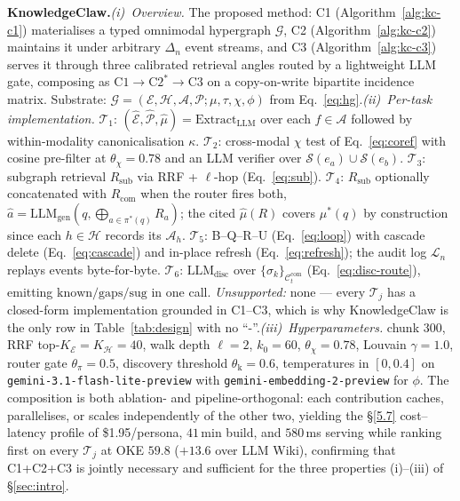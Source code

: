 \documentclass{article}
\begin{document}
\noindent\textbf{KnowledgeClaw.}\quad\emph{(i)~Overview.} The proposed method: C1 (Algorithm~\ref{alg:kc-c1}) materialises a typed omnimodal hypergraph $\mathcal{G}$, C2 (Algorithm~\ref{alg:kc-c2}) maintains it under arbitrary $\Delta_n$ event streams, and C3 (Algorithm~\ref{alg:kc-c3}) serves it through three calibrated retrieval angles routed by a lightweight LLM gate, composing as $\mathrm{C1}\!\to\!\mathrm{C2}^{*}\!\to\!\mathrm{C3}$ on a copy-on-write bipartite incidence matrix. Substrate: $\mathcal{G}\!=\!(\mathcal{E},\mathcal{H},\mathcal{A},\mathcal{P};\mu,\tau,\chi,\phi)$ from Eq.~\eqref{eq:hg}.\quad\emph{(ii)~Per-task implementation.} $\mathcal{T}_1$: $(\hat{\mathcal{E}},\hat{\mathcal{P}},\hat{\mu})\!=\!\mathrm{Extract}_{\mathrm{LLM}}$ over each $f\!\in\!\mathcal{A}$ followed by within-modality canonicalisation $\kappa$. $\mathcal{T}_2$: cross-modal $\chi$ test of Eq.~\eqref{eq:coref} with cosine pre-filter at $\theta_{\chi}\!=\!0.78$ and an LLM verifier over $\mathcal{S}(e_a)\!\cup\!\mathcal{S}(e_b)$. $\mathcal{T}_3$: subgraph retrieval $R_{\mathrm{sub}}$ via RRF + $\ell$-hop (Eq.~\eqref{eq:sub}). $\mathcal{T}_4$: $R_{\mathrm{sub}}$ optionally concatenated with $R_{\mathrm{com}}$ when the router fires both, $\hat{a}\!=\!\mathrm{LLM}_{\mathrm{gen}}(q,\bigoplus_{a\in\pi^{*}(q)}R_a)$; the cited $\hat{\mu}(R)$ covers $\mu^{*}(q)$ by construction since each $h\!\in\!\mathcal{H}$ records its $\mathcal{A}_h$. $\mathcal{T}_5$: B--Q--R--U (Eq.~\eqref{eq:loop}) with cascade delete (Eq.~\eqref{eq:cascade}) and in-place refresh (Eq.~\eqref{eq:refresh}); the audit log $\mathcal{L}_n$ replays events byte-for-byte. $\mathcal{T}_6$: $\mathrm{LLM}_{\mathrm{disc}}$ over $\{\sigma_k\}_{\mathcal{C}_t^{\mathrm{com}}}$ (Eq.~\eqref{eq:disc-route}), emitting $\mathrm{known}/\mathrm{gaps}/\mathrm{sug}$ in one call. \emph{Unsupported:} none --- every $\mathcal{T}_j$ has a closed-form implementation grounded in C1--C3, which is why KnowledgeClaw is the only row in Table~\ref{tab:design} with no ``-''.\quad\emph{(iii)~Hyperparameters.} chunk $300$, RRF top-$K_{\mathcal{E}}\!=\!K_{\mathcal{H}}\!=\!40$, walk depth $\ell\!=\!2$, $k_0\!=\!60$, $\theta_{\chi}\!=\!0.78$, Louvain $\gamma\!=\!1.0$, router gate $\theta_{\pi}\!=\!0.5$, discovery threshold $\theta_{\mathrm{k}}\!=\!0.6$, temperatures in $[0,0.4]$ on \texttt{gemini-3.1-flash-lite-preview} with \texttt{gemini-embedding-2-preview} for $\phi$. The composition is both ablation- and pipeline-orthogonal: each contribution caches, parallelises, or scales independently of the other two, yielding the \S\ref{5.7} cost--latency profile of \$1.95/persona, $41$\,min build, and $580$\,ms serving while ranking first on every $\mathcal{T}_j$ at OKE $59.8$ ($+13.6$ over LLM Wiki), confirming that C1+C2+C3 is jointly necessary and sufficient for the three properties (i)--(iii) of \S\ref{sec:intro}.
\end{document}
